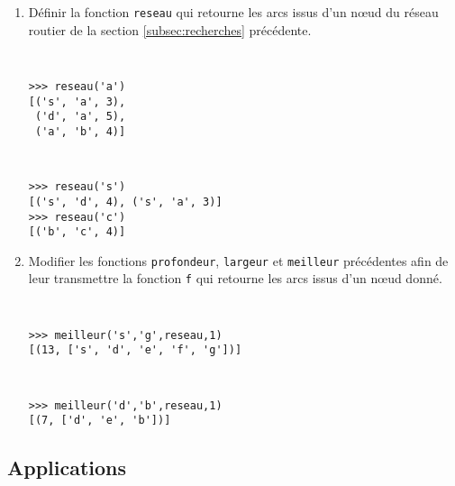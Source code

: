 \begin{question} \mbox{}
\begin{enumerate}
\item Définir la fonction \texttt{reseau} qui retourne les arcs issus d'un n\oe ud
	du réseau routier de la section \ref{subsec:recherches} précédente.
	
\noindent\begin{minipage}[t]{7cm}\tt\footnotesize
\begin{Verbatim}
>>> reseau('a')
[('s', 'a', 3), 
 ('d', 'a', 5), 
 ('a', 'b', 4)]
\end{Verbatim}
\end{minipage}
\hfill
\begin{minipage}[t]{7cm}\tt\footnotesize
\begin{Verbatim}
>>> reseau('s')
[('s', 'd', 4), ('s', 'a', 3)]
>>> reseau('c')
[('b', 'c', 4)]
\end{Verbatim}
\end{minipage}
\vspace*{2mm}

\item Modifier les fonctions
\texttt{profondeur}, \texttt{largeur} et \texttt{meilleur} précédentes afin 
de leur transmettre la fonction \texttt{f} qui retourne les arcs issus d'un n\oe ud donné.

\noindent\begin{minipage}[t]{7cm}\tt\footnotesize
\begin{Verbatim}
>>> meilleur('s','g',reseau,1)
[(13, ['s', 'd', 'e', 'f', 'g'])]
\end{Verbatim}
\end{minipage}
\hfill
\begin{minipage}[t]{7cm}\tt\footnotesize
\begin{Verbatim}
>>> meilleur('d','b',reseau,1)
[(7, ['d', 'e', 'b'])]
\end{Verbatim}
\end{minipage}
\vspace*{2mm}

\end{enumerate}


\end{question}

\subsection{Applications}

